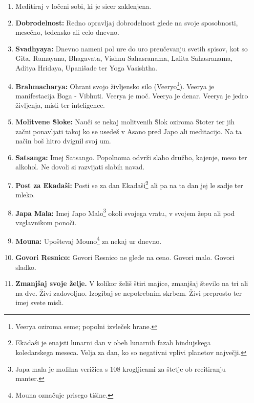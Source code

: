 \begin{enumerate}
    \item Meditiraj v ločeni sobi, ki je sicer zaklenjena.
    
    \item \textbf{Dobrodelnost:} Redno opravljaj dobrodelnost glede na svoje sposobnosti, mesečno, tedensko ali celo dnevno.
    
    \item \textbf{Svadhyaya:} Dnevno nameni pol ure do uro preučevanju svetih spisov, kot so  Gita, Ramayana, Bhagavata, Vishnu-Sahasranama, Lalita-Sahasranama, Aditya Hridaya, Upanišade ter Yoga Vasishtha.
    
    \item \textbf{Brahmacharya:} Ohrani svojo življensko silo (Veeryo\footnote{Veerya oziroma seme; popolni izvleček hrane.}). Veerya je manifestacija Boga - Vibhuti. Veerya je moč. Veerya je denar. Veerya je jedro življenja, misli ter inteligence.
    
    \item \textbf{Molitvene \`{S}loke:} Nauči se nekaj molitvenih \`{S}lok oziroma Stoter ter jih začni ponavljati takoj ko se usedeš v Asano pred Japo ali meditacijo. Na ta način boš hitro dvignil svoj um.
    
    \item \textbf{Satsanga:} Imej Satsango. Popolnoma odvrži slabo družbo, kajenje, meso ter alkohol. Ne dovoli si razvijati slabih navad.
    
    \item \textbf{Post za Ekadaši:} Posti se za dan Ekadaši\footnote{Ek\={a}da\'{s}i je enajsti lunarni dan v obeh lunarnih fazah hindujskega koledarskega meseca. Velja za dan, ko so negativni vplivi planetov največji.} ali pa na ta dan jej le sadje ter mleko.
    
    \item \textbf{Japa Mala:} Imej Japo Malo\footnote{Japa mala je molilna verižica s 108 krogljicami za štetje ob recitiranju manter.} okoli svojega vratu, v svojem žepu ali pod vzglavnikom ponoči.
    
    \item \textbf{Mouna:} Upoštevaj Mouno\footnote{Mouna označuje prisego tišine.} za nekaj ur dnevno.
    
    \item \textbf{Govori Resnico:} Govori Resnico ne glede na ceno. Govori malo. Govori sladko.
    
    \item \textbf{Zmanjšaj svoje želje.} V kolikor želiš štiri majice, zmanjšaj število na tri ali na dve. Živi zadovoljno. Izogibaj se nepotrebnim skrbem. Živi preprosto ter imej svete misli.
    

\end{enumerate}

